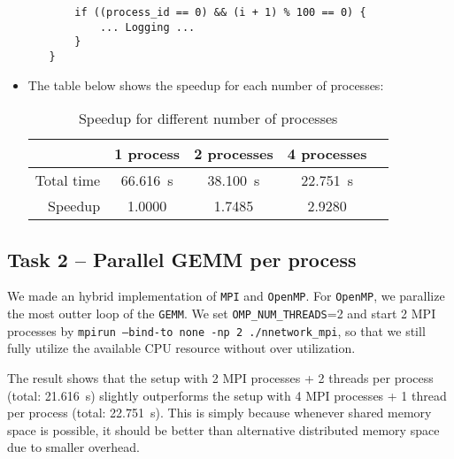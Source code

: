 \documentclass[a4paper, DIV12, headsepline]{scrartcl}
\begin{document}
\begin{itemize}
\begin{itemize}
\begin{verbatim}
    if ((process_id == 0) && (i + 1) % 100 == 0) {
        ... Logging ...
    }
}
\end{verbatim}
\end{itemize}

\item The table below shows the speedup for each number of processes:

\begin{table}[htbp]
\centering
{}
\begin{tabular}{rSSSS}
\hline
{} & {1 process} & {2 processes} & {4 processes} \\
\hline
Total time & \SI{66.616}{s}  & \SI{38.100}{s}  & \SI{22.751}{s}   \\
Speedup & \SI{1.0000}{} & \SI{1.7485}{} & \SI{2.9280}{} \\
\hline
\end{tabular}
\caption{Speedup for different number of processes}
\label{tab:tab22}
\end{table}

%
%

\end{itemize}

\subsection*{Task 2 -- Parallel GEMM per process}
We made an hybrid implementation of \texttt{MPI} and \texttt{OpenMP}. For \texttt{OpenMP}, we parallize the most outter loop of the \texttt{GEMM}.
We set \texttt{OMP\_NUM\_THREADS}=2 and start 2 MPI processes by \texttt{mpirun --bind-to none -np 2 ./nnetwork\_mpi}, so that we still fully utilize the available CPU resource without over utilization.

The result shows that the setup with 2 MPI processes + 2 threads per process (total: \SI{21.616}{s}) slightly outperforms the setup with 4 MPI processes + 1 thread per process (total: \SI{22.751}{s}).
This is simply because whenever shared memory space is possible, it should be better than alternative distributed memory space due to smaller overhead.
\end{document}
